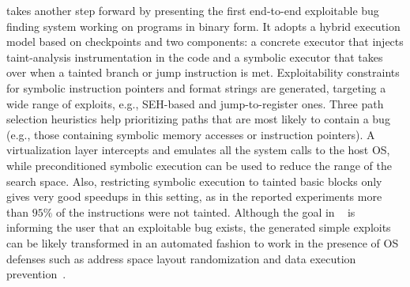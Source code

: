 \cite{MAYHEM-SP12} takes another step forward by presenting the first end-to-end exploitable bug finding system working on programs in binary form. It adopts a hybrid execution model based on checkpoints and two components: a concrete executor that injects taint-analysis instrumentation in the code and a symbolic executor that takes over when a tainted branch or jump instruction is met. Exploitability constraints for symbolic instruction pointers and format strings are generated, targeting a wide range of exploits, e.g., SEH-based and jump-to-register ones. Three path selection heuristics help prioritizing paths that are most likely to contain a bug (e.g., those containing symbolic memory accesses or instruction pointers). A virtualization layer intercepts and emulates all the system calls to the host OS, while preconditioned symbolic execution can be used to reduce the range of the search space. Also, restricting symbolic execution to tainted basic blocks only gives very good speedups in this setting, as in the reported experiments more than $95\%$ of the instructions were not tainted. Although the goal in ~\cite{MAYHEM-SP12} is informing the user that an exploitable bug exists, the generated simple exploits can be likely transformed in an automated fashion to work in the presence of OS defenses such as address space layout randomization and data execution prevention~\cite{Q-SEC11}. 

